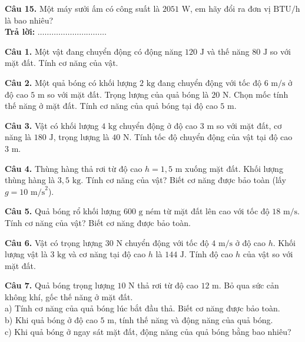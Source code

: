 \documentclass{article}
\begin{document}
\vspace*{\fill}

\textbf{Câu 15.} Một máy sưởi ấm có công suất là $2051\text{ W}$, em hãy đổi ra đơn vị $\text{BTU/h}$ là bao nhiêu?\\
\textbf{Trả lời:} $\dots\dots\dots\dots\dots\dots\dots\dots\dots\dots$
\vspace*{\fill}
\newpage

\fontsize{24}{32}\selectfont
\textbf{Câu 1.} Một vật đang chuyển động có động năng $120\text{ J}$ và thế năng $80\text{ J}$ so với mặt đất. Tính cơ năng của vật.

\vspace*{\fill}

\textbf{Câu 2.} Một quả bóng có khối lượng $2\text{ kg}$ đang chuyển động với tốc độ $6\text{ m/s}$ ở độ cao $5\text{ m}$ so với mặt đất. Trọng lượng của quả bóng là $20\text{ N}$. Chọn mốc tính thế năng ở mặt đất. Tính cơ năng của quả bóng tại độ cao $5\text{ m}$.
\vspace*{\fill}
\newpage

\fontsize{24}{32}\selectfont
\textbf{Câu 3.} Vật có khối lượng $4\text{ kg}$ chuyển động ở độ cao $3\text{ m}$ so với mặt đất, cơ năng là $180\text{ J}$, trọng lượng là $40\text{ N}$. Tính tốc độ chuyển động của vật tại độ cao $3\text{ m}$.

\vspace*{\fill}

\textbf{Câu 4.} Thùng hàng thả rơi từ độ cao $h = 1,5\text{ m}$ xuống mặt đất. Khối lượng thùng hàng là $3,5\text{ kg}$. Tính cơ năng của vật? Biết cơ năng được bảo toàn (lấy $g = 10\text{ m/s}^2$).
\vspace*{\fill}
\newpage

\fontsize{24}{32}\selectfont
\textbf{Câu 5.} Quả bóng rổ khối lượng $600\text{ g}$ ném từ mặt đất lên cao với tốc độ $18\text{ m/s}$. Tính cơ năng của vật? Biết cơ năng được bảo toàn.

\vspace*{\fill}

\textbf{Câu 6.} Vật có trọng lượng $30\text{ N}$ chuyển động với tốc độ $4\text{ m/s}$ ở độ cao $h$. Khối lượng vật là $3\text{ kg}$ và cơ năng tại độ cao $h$ là $144\text{ J}$. Tính độ cao $h$ của vật so với mặt đất.
\vspace*{\fill}
\newpage

\fontsize{25}{33}\selectfont
\textbf{Câu 7.} Quả bóng trọng lượng $10\text{ N}$ thả rơi từ độ cao $12\text{ m}$. Bỏ qua sức cản không khí, gốc thế năng ở mặt đất.\\
a) Tính cơ năng của quả bóng lúc bắt đầu thả. Biết cơ năng được bảo toàn.\\
b) Khi quả bóng ở độ cao $5\text{ m}$, tính thế năng và động năng của quả bóng.\\
c) Khi quả bóng ở ngay sát mặt đất, động năng của quả bóng bằng bao nhiêu?
\vspace*{\fill}
\newpage
\end{document}
